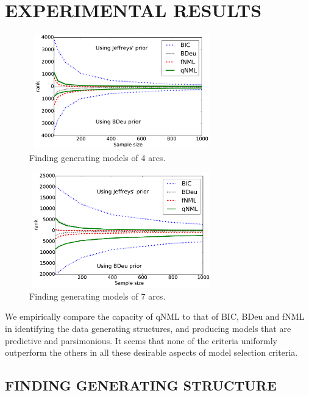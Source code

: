 \section{EXPERIMENTAL RESULTS}

\begin{figure}
\centering
\includegraphics[width=8cm,height=5cm]{qNML_images/art4_mean.pdf}
\caption{Finding generating models of 4 arcs.}
\label{fig:4arcs}
\end{figure}

\begin{figure}
\centering
\includegraphics[width=8cm,height=5cm]{qNML_images/art7_mean.pdf}
\caption{Finding generating models of 7 arcs.}
\label{fig:4arcs}
\end{figure}

We empirically compare the capacity of qNML to that of BIC, BDeu and
fNML in identifying the data generating structures, and producing
models that are predictive and parsimonious.  It seems that none of
the criteria uniformly outperform the others in all these desirable
aspects of model selection criteria.

\subsection{FINDING GENERATING STRUCTURE}

